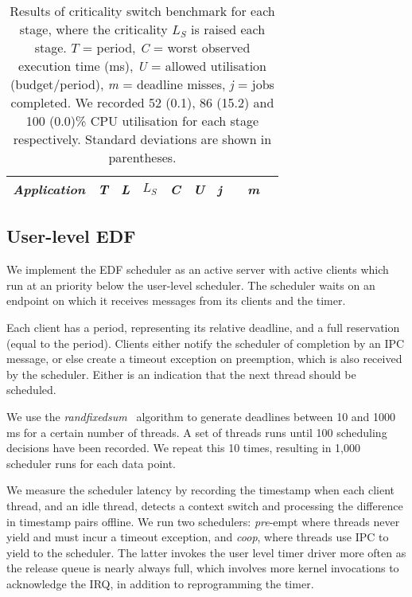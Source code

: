 \begin{table}[h]
    \centering
    \begin{tabular}{lcccccclcl}\toprule
        \emph{Application} & \emph{T} & \emph{L} & \emph{\(L_S\)} & \emph{C} & \emph{U} & \emph{j} &
        & \emph{m}  & \\\midrule
        
        \bottomrule
    \end{tabular}
    \caption[Results of criticality switch benchmark.]{Results of criticality switch benchmark for each
        stage, where the  criticality \(L_S\) is raised each stage. \(T\) =
        period, \textit{C} = worst observed execution time (ms),
      \textit{U} = allowed utilisation (budget/period),
      \textit{m} = deadline misses, \textit{j} = jobs completed. We recorded 52 (0.1), 86 (15.2)
      and 100 (0.0)\% CPU
utilisation for each stage respectively. Standard deviations are shown in parentheses.}
    \label{t:modeswitch}
\end{table}

\subsection{User-level EDF}\label{s:edf-impl}

We implement the EDF scheduler as an active server with active
clients which run at an \selfour priority below the user-level scheduler.
The scheduler waits on an endpoint on which it receives messages from
its clients and the timer.

Each client has a period, representing its relative deadline, and a full reservation (equal to the period). Clients
either notify the scheduler of completion by an IPC
message, or else create a timeout exception on preemption, which is also received by the
scheduler. Either is an indication that the next thread should be scheduled.

We use the \emph{randfixedsum}~\citep{Emberson_SD_10} algorithm to
generate deadlines between 10 and 1000\,ms for a certain number of threads.
A set of threads runs until 100
scheduling decisions have been recorded. We repeat this 10 times,
resulting in 1,000 scheduler runs for each data point.

We measure the scheduler latency by recording the timestamp when each client thread, and an idle
thread, detects a
context switch and processing the difference in timestamp pairs offline. We run two schedulers:
\emph{pre}-empt where threads never yield and must incur a timeout exception, and \emph{coop}, where
threads use IPC to yield to the scheduler. The latter invokes the user level timer
driver more often as the release queue is nearly always full, which involves more kernel invocations
to acknowledge the IRQ, in addition to reprogramming the timer.

